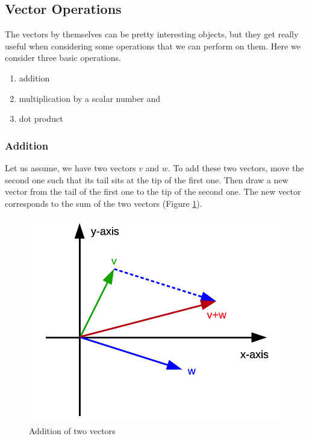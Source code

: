 \documentclass[]{book}
\providecommand{\tightlist}{%
  \setlength{\itemsep}{0pt}\setlength{\parskip}{0pt}}
\theoremstyle{definition}
\theoremstyle{definition}
\theoremstyle{definition}
\theoremstyle{remark}
\begin{document}
\hypertarget{intro-linalg-vector-operations}{%
\subsection{Vector Operations}\label{intro-linalg-vector-operations}}

The vectors by themselves can be pretty interesting objects, but they get really useful when considering some operations that we can perform on them. Here we consider three basic operations.

\begin{enumerate}
\def\labelenumi{\arabic{enumi}.}
\tightlist
\item
  addition
\item
  multiplication by a scalar number and
\item
  dot product
\end{enumerate}

\hypertarget{intro-linalg-vector-addition}{%
\subsubsection{Addition}\label{intro-linalg-vector-addition}}

Let us assume, we have two vectors \(v\) and \(w\). To add these two vectors, move the second one such that its tail sits at the tip of the first one. Then draw a new vector from the tail of the first one to the tip of the second one. The new vector corresponds to the sum of the two vectors (Figure \ref{fig:vector-sum}).

\begin{figure}
\centering
\includegraphics{odg/vector-sum.png}
\caption{\label{fig:vector-sum}Addition of two vectors}
\end{figure}
\end{document}
